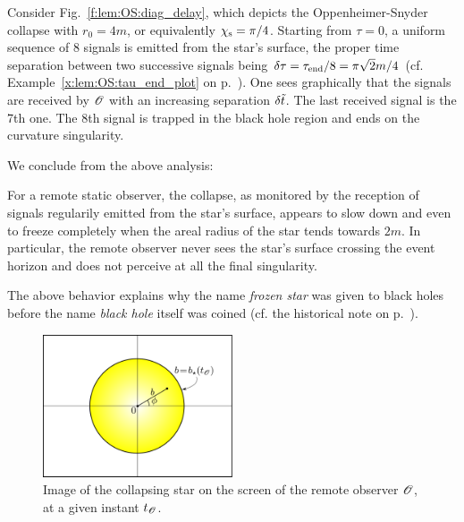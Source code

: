 \begin{example}
Consider Fig.~\ref{f:lem:OS:diag_delay}, which depicts the Oppenheimer-Snyder collapse
with $r_0 = 4 m$, or equivalently $\chi_{\rm s} = \pi/4$. Starting from $\tau=0$, a uniform sequence of 8 signals is emitted from the star's surface, the proper time separation between two successive signals being
$\delta\tau = \tau_{\rm end}/8 = \pi\sqrt{2} m / 4$ (cf. Example~\ref{x:lem:OS:tau_end_plot} on
p.~\pageref{x:lem:OS:tau_end_plot}). One sees graphically that the signals are received by $\mathscr{O}$
with an increasing separation $\delta{\tilde t}$. The last received signal is the 7th one. The 8th signal is trapped in the black hole region and ends on the curvature singularity.
\end{example}

We conclude from the above analysis:
\begin{prop}
For a remote static observer, the collapse, as monitored by the reception of signals regularily emitted from the star's surface,
appears to slow down and even to freeze completely when the areal radius
of the star tends towards $2 m$. In particular, the remote observer never sees the
star's surface crossing the event horizon and does not perceive at all the final singularity.
\end{prop}

\begin{hist}
The above behavior explains why the name \emph{frozen star}
was given to black holes before the name \emph{black hole} itself was coined
(cf. the historical note on p.~\pageref{h:glo:black_hole_name}).
\end{hist}


\begin{figure}
\centerline{
\includegraphics[width=0.5\textwidth]{lem_image.pdf}
}
\caption[]{\label{f:lem:image} \footnotesize
Image of the collapsing star on the screen of the remote observer $\mathscr{O}$, at
a given instant $t_{\mathscr{O}}$.
}
\end{figure}


